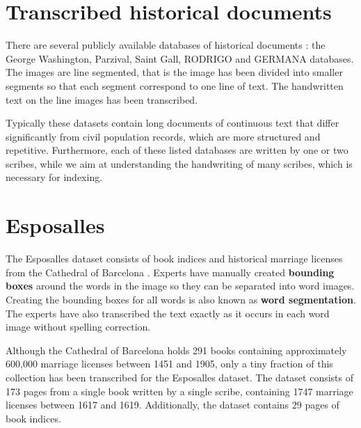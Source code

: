 \newpage
\section{Transcribed historical documents}

There are several publicly available databases of historical documents \cite{esposalles}: the George Washington, Parzival, Saint Gall, RODRIGO and GERMANA databases. The images are line segmented, that is the image has been divided into smaller segments so that each segment correspond to one line of text. The handwritten text on the line images has been transcribed.

Typically these datasets contain long documents of continuous text that differ significantly from civil population records, which are more structured and repetitive. Furthermore, each of these listed databases are written by one or two scribes, while we aim at understanding the handwriting of many scribes, which is necessary for indexing.

\section{Esposalles}
The Esposalles dataset consists of book indices and historical marriage licenses from the Cathedral of Barcelona \cite{esposalles}.
Experts have manually created \textbf{bounding boxes} around the words in the image so they can be separated into word images. Creating the bounding boxes for all words is also known as \textbf{word segmentation}.
The experts have also transcribed the text exactly as it occurs in each word image without spelling correction.

Although the Cathedral of Barcelona holds 291 books containing approximately 600,000 marriage licenses between 1451 and 1905, only a tiny fraction of this collection has been transcribed for the Esposalles dataset. The dataset consists of 173 pages from a single book written by a single scribe, containing 1747 marriage licenses between 1617 and 1619. Additionally, the dataset contains 29 pages of book indices.

